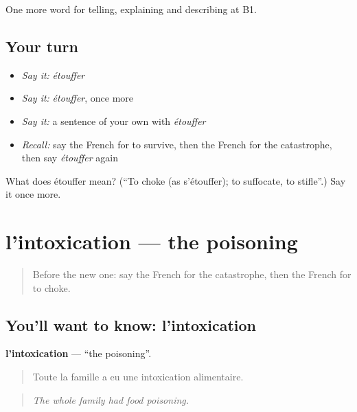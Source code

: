 \begin{grammarlens}[title={What you've built}]
One more word for telling, explaining and describing at B1.
\end{grammarlens}

\subsection*{Your turn}
\begin{itemize}
\raggedright
  \item \emph{Say it:} \emph{étouffer}
  \item \emph{Say it:} \emph{étouffer}, once more
  \item \emph{Say it:} a sentence of your own with \emph{étouffer}
  \item \emph{Recall:} say the French for to survive, then the French for the catastrophe, then say \emph{étouffer} again
\end{itemize}

\begin{tcolorbox}[breakable,colback=teal!4,colframe=teal!35!black,title={Before you move on}]
What does étouffer mean? (\textquotedblleft{}To choke (as s'étouffer); to suffocate, to stifle\textquotedblright{}.) Say it once more.
\end{tcolorbox}
\section[l'intoxication]{l'intoxication — the poisoning}

\label{lesson:FR-C306-intoxication}



\begin{quote}
Before the new one: say the French for the catastrophe, then the French for to choke.
\end{quote}

\subsection*{You'll want to know: l'intoxication}
\textbf{l'intoxication} — \textquotedblleft{}the poisoning\textquotedblright{}.

\begin{quote}
Toute la famille a eu une intoxication alimentaire.
\end{quote}

\begin{quote}
\emph{The whole family had food poisoning.}
\end{quote}

